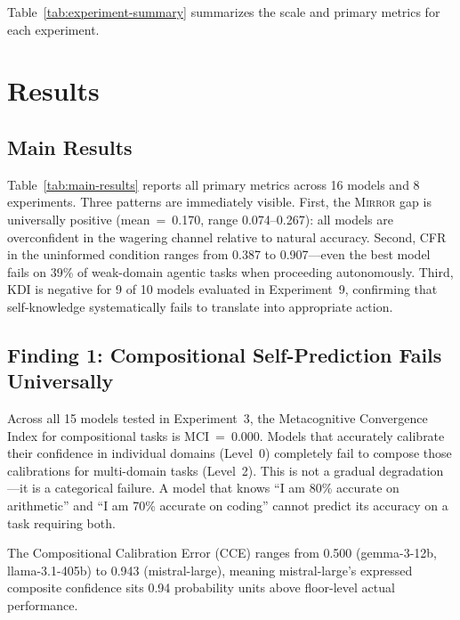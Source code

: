 \documentclass[10pt]{article}
\newcommand{\mirror}{\textsc{Mirror}}
\newcommand{\MCI}{MCI}
\newcommand{\CCE}{CCE}
\newcommand{\KDI}{KDI}
\newcommand{\CFR}{CFR}
\begin{document}
Table~\ref{tab:experiment-summary} summarizes the scale and primary metrics for
each experiment.



\section{Results}
\label{sec:results}

\subsection{Main Results}

Table~\ref{tab:main-results} reports all primary metrics across 16 models and 8
experiments. Three patterns are immediately visible. First, the \mirror{} gap is
universally positive (mean~=~0.170, range 0.074--0.267): all models are
overconfident in the wagering channel relative to natural accuracy. Second, \CFR{}
in the uninformed condition ranges from 0.387 to 0.907---even the best model fails
on 39\% of weak-domain agentic tasks when proceeding autonomously. Third, \KDI{}
is negative for 9 of 10 models evaluated in Experiment~9, confirming that
self-knowledge systematically fails to translate into appropriate action.



\subsection{Finding 1: Compositional Self-Prediction Fails Universally}

Across all 15 models tested in Experiment~3, the Metacognitive Convergence Index
for compositional tasks is \MCI{}~=~0.000. Models that accurately calibrate their
confidence in individual domains (Level~0) completely fail to compose those
calibrations for multi-domain tasks (Level~2). This is not a gradual
degradation---it is a categorical failure. A model that knows ``I am 80\% accurate
on arithmetic'' and ``I am 70\% accurate on coding'' cannot predict its accuracy on
a task requiring both.

The Compositional Calibration Error (\CCE{}) ranges from 0.500 (gemma-3-12b,
llama-3.1-405b) to 0.943 (mistral-large), meaning mistral-large's expressed
composite confidence sits 0.94 probability units above floor-level actual
performance.
\end{document}
